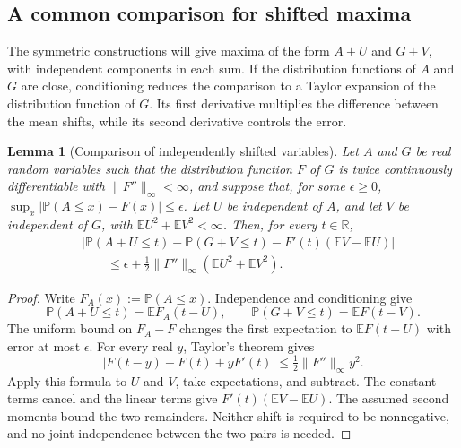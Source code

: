 \documentclass[11pt,letterpaper]{article}
\newtheorem{lemma}{Lemma}
\theoremstyle{remark}
\newcommand{\E}{\mathbb E}
\newcommand{\Pp}{\mathbb P}
\newcommand{\R}{\mathbb R}
\begin{document}
\subsection{A common comparison for shifted maxima}
\label{app:lower-comparison}

The symmetric constructions will give maxima of the form $A+U$
and $G+V$, with independent components in each sum. If the
distribution functions of $A$ and $G$ are close, conditioning
reduces the comparison to a Taylor expansion of the distribution
function of $G$. Its first derivative multiplies the difference
between the mean shifts, while its second derivative controls
the error.

\begin{lemma}[Comparison of independently shifted variables]
\label{lower:shift-comparison}
Let $A$ and $G$ be real random variables such that the distribution
function $F$ of $G$ is twice continuously differentiable with
$\|F''\|_\infty<\infty$, and suppose that, for some $\epsilon\ge0$,
$\sup_x|\Pp(A\le x)-F(x)|\le\epsilon$.
Let $U$ be independent of $A$, and let $V$ be independent of $G$,
with $\E U^2+\E V^2<\infty$. Then, for every $t\in\R$,
\begin{equation}
\begin{split}
&\left|\Pp(A+U\le t)-\Pp(G+V\le t)
       -F'(t)(\E V-\E U)\right|\\
&\hspace{2em}\le \epsilon+
       \frac12\|F''\|_\infty(\E U^2+\E V^2).
\end{split}
\label{lower:eq:shift-comparison}
\end{equation}
\end{lemma}

\begin{proof}
Write $F_A(x):=\Pp(A\le x)$. Independence and conditioning give
\[
 \Pp(A+U\le t)=\E F_A(t-U),\qquad
 \Pp(G+V\le t)=\E F(t-V).
\]
The uniform bound on $F_A-F$ changes the first expectation to
$\E F(t-U)$ with error at most $\epsilon$. For every real $y$,
Taylor's theorem gives
\[
 |F(t-y)-F(t)+yF'(t)|\le\tfrac12\|F''\|_\infty y^2.
\]
Apply this formula to $U$ and $V$, take expectations, and subtract.
The constant terms cancel and the linear terms give
$F'(t)(\E V-\E U)$. The assumed second moments bound the two
remainders. Neither shift is required to be nonnegative, and no
joint independence between the two pairs is needed.
\end{proof}
\end{document}

